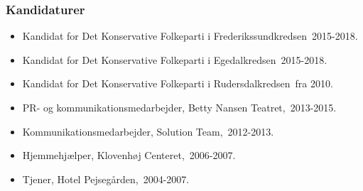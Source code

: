\documentclass[11pt, a4paper]{awesome-cv}
\begin{document}
\begin{cvletter}
\subsubsection*{Kandidaturer}
\begin{itemize}
\item Kandidat for Det Konservative Folkeparti i Frederikssundkredsen 2015-2018.
\item Kandidat for Det Konservative Folkeparti i Egedalkredsen 2015-2018.
\item Kandidat for Det Konservative Folkeparti i Rudersdalkredsen fra 2010.
\end{itemize}
\begin{itemize}
\item PR- og kommunikationsmedarbejder, Betty Nansen Teatret, 2013-2015.
\item Kommunikationsmedarbejder, Solution Team, 2012-2013.
\item Hjemmehjælper, Klovenhøj Centeret, 2006-2007.
\item Tjener, Hotel Pejsegården, 2004-2007.
\end{itemize}
\end{cvletter}
\end{document}
